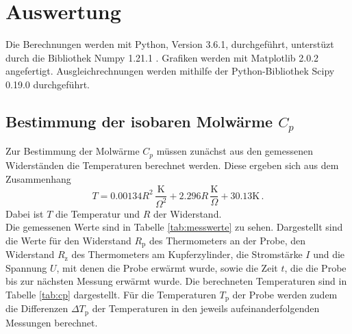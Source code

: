 \section{Auswertung}
\label{sec:Auswertung}
Die Berechnungen werden mit Python, Version 3.6.1, durchgeführt, unterstüzt durch die Bibliothek Numpy 1.21.1 \cite{numpy}. Grafiken werden mit Matplotlib 2.0.2 \cite{matplotlib} angefertigt.
Ausgleichrechnungen werden mithilfe der Python-Bibliothek Scipy 0.19.0 \cite{scipy} durchgeführt.

\subsection{Bestimmung der isobaren Molwärme $C_p$}
\label{subsec:cp}
Zur Bestimmung der Molwärme $C_p$ müssen zunächst aus den gemessenen
Widerständen die Temperaturen berechnet werden. Diese ergeben sich aus dem
Zusammenhang
\begin{equation*}
  T=0.00134R^2\,\frac{\text{K}}{\Omega^2}+2.296R\,\frac{\text{K}}{\Omega}+30.13\text{K} \,.
\end{equation*}
Dabei ist $T$ die Temperatur und $R$ der Widerstand.\\
Die gemessenen Werte sind in Tabelle \ref{tab:messwerte} zu sehen.
Dargestellt sind die Werte für den Widerstand $R_\text{p}$ des Thermometers an der Probe,
den Widerstand $R_\text{z}$ des Thermometers am Kupferzylinder, die Stromstärke $I$ und
die Spannung $U$, mit denen die Probe erwärmt wurde, sowie die Zeit $t$,
die die Probe bis zur nächsten Messung erwärmt wurde.
Die berechneten Temperaturen sind in Tabelle \ref{tab:cp} dargestellt. Für die
Temperaturen $T_\text{p}$ der Probe werden zudem die Differenzen $\Delta T_\text{p}$ der Temperaturen
in den jeweils aufeinanderfolgenden Messungen berechnet.

